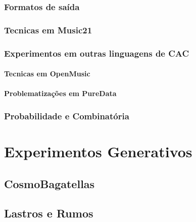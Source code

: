 \documentclass[
	12pt,				%
	openright,			%
	twoside,			%
	a4paper,			%
	english,			%
	french,				%
	spanish,			%
	brazil				%
	]{abntex2}
\begin{document}
\section{Formatos de saída}

\section{Tecnicas em Music21}

\section{Experimentos em outras linguagens de CAC}

\subsection{Tecnicas em OpenMusic}

\subsection{Problematizações em PureData}

\section{Probabilidade e Combinatória}




\part{Experimentos Generativos}

\chapter{CosmoBagatellas}


\chapter{Lastros e Rumos}





\postextual

%

%
%
\end{document}
